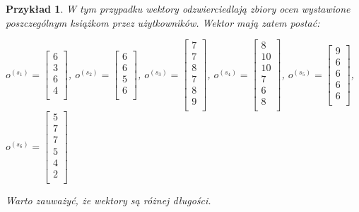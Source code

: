 \documentclass[12pt,a4paper]{report}
\newtheorem{przyklad}{Przykład}[chapter]
\begin{document}
\begin{przyklad}
W tym przypadku wektory odzwierciedlają zbiory ocen wystawione poszczególnym książkom przez użytkowników.
Wektor mają zatem postać:
\begin{center}
$o^{(s_1)} = \left[
        \begin{array}{c}
         6 \\
         3 \\
         6 \\
         4 \\
         \end{array}
      \right]$, $o^{(s_2)} = \left[
        \begin{array}{c}
         6 \\
         6 \\
         5 \\
         6 \\
         \end{array}
      \right]$, $o^{(s_3)} = \left[
        \begin{array}{c}
         7 \\
         7 \\
         8 \\
         7 \\
         8 \\
         9 \\
         \end{array}
      \right]$, $o^{(s_4)} = \left[
        \begin{array}{c}
         8 \\
         10 \\
         10 \\
         7 \\
         6 \\
         8 \\
         \end{array}
      \right]$, $o^{(s_5)} = \left[
        \begin{array}{c}
         9 \\
         6 \\
         6 \\
         6 \\
         6 \\
         \end{array}
      \right]$, $o^{(s_6)} = \left[
        \begin{array}{c}
         5 \\
         7 \\
         7 \\
         5 \\
         4 \\
         2 \\
         \end{array}
      \right]$
\end{center}
Warto zauważyć, że wektory są różnej długości.


\end{przyklad}
\end{document}
